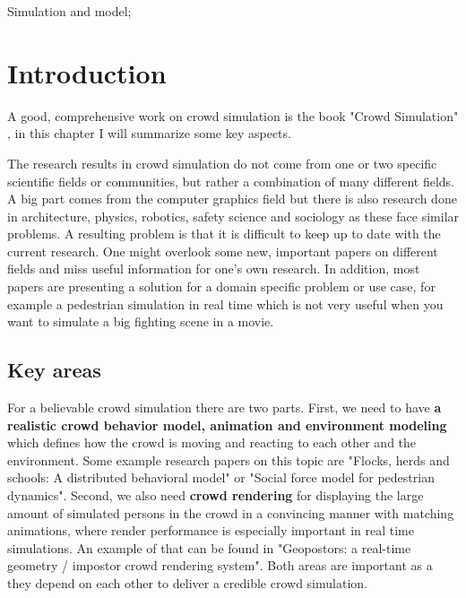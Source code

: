 \documentclass{acmsiggraph}               %
\begin{document}
\begin{CRcatlist}
{Simulation and model}{};
\end{CRcatlist}

\keywordlist

\section{Introduction}


\copyrightspace


A good, comprehensive work on crowd simulation is the book "Crowd Simulation" \cite{thalmann_crowd_2013}, in this chapter I will summarize some key aspects. 

The research results in crowd simulation do not come from one or two specific scientific fields or communities, but rather a combination of many different fields. A big part comes from the computer graphics field but there is also research done in architecture, physics, robotics, safety science and sociology as these face similar problems. A resulting problem is that it is difficult to keep up to date with the current research. One might overlook some new, important papers on different fields and miss useful information for one's own research. In addition, most papers are presenting a solution for a domain specific problem or use case, for example a pedestrian simulation in real time \cite{karamouzas_predictive_2009} which is not very useful when you want to simulate a big fighting scene in a movie.

\subsection{Key areas}
\label{chap:key_areas}
For a believable crowd simulation there are two parts. First, we need to have \textbf{a realistic crowd behavior model, animation and environment modeling} which defines how the crowd is moving and reacting to each other and the environment. Some example research papers on this topic are "Flocks, herds and schools: A distributed behavioral model"\cite{reynolds_flocks_1987} or "Social force model for pedestrian dynamics"\cite{helbing_social_1995}. Second, we also need \textbf{crowd rendering} for displaying the large amount of simulated persons in the crowd in a convincing manner with matching animations, where render performance is especially important in real time simulations. An example of that can be found in "Geopostors: a real-time geometry / impostor crowd rendering system"\cite{lee_crowd_2018}. Both areas are important as a they depend on each other to deliver a credible crowd simulation.
\end{document}
